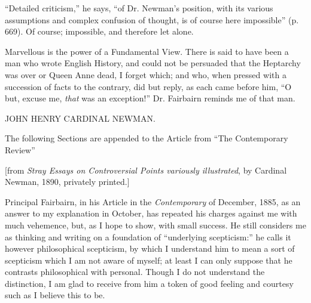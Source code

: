 ``Detailed criticism,'' he says, ``of Dr. Newman's
position, with its various assumptions and complex confusion of
thought, is of course here impossible'' (p. 669). Of course;
impossible, and therefore let alone.

Marvellous is the power of a Fundamental View. There is said to
have been a man who wrote English History, and could not be persuaded
that the Heptarchy was over or Queen Anne dead, I forget which; and
who, when pressed with a succession of facts to the contrary, did but
reply, as each came before him, ``O but, excuse me, \emph{that}
was an exception!'' Dr. Fairbairn reminds me of that man.

JOHN HENRY CARDINAL
NEWMAN.

The following Sections are appended to the
Article from ``The Contemporary Review''

[from \emph{Stray Essays on Controversial Points variously illustrated},
by Cardinal Newman, 1890, privately printed.]


Principal Fairbairn, in his Article in the \emph{Contemporary}
of December, 1885, as an answer to my
explanation in October, has repeated his charges against me with much
vehemence, but, as I hope to show, with small success. He still
considers me as thinking and writing on a foundation of ``underlying
scepticism:'' he calls it however philosophical scepticism, by which I
understand him to mean a sort of scepticism which I am not aware of
myself; at least I can only suppose that he contrasts philosophical
with personal. Though I do not understand the distinction, I am glad
to receive from him a token of good feeling and courtesy such as I
believe this to be.

